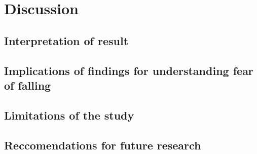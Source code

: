\chapter{Discussion}
    \section{Interpretation of result}
    \section{Implications of findings for understanding fear of falling}
    \section{Limitations of the study}
    \section{Reccomendations for future research}